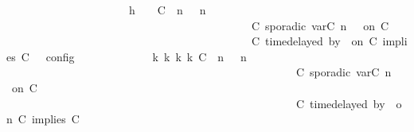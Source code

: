 \begin{isabellebody}
\ \ \ \ \ \ \ \ \isamarkupfalse%
\ {\isacharminus}\isanewline
\ \ \ \ \ \ \ \ \ \ \isamarkupfalse%
\ h{}{\isacharcolon}\ {\isacartoucheopen}{\isasymrho}\ {\isasymin}\ {\isasymlbrakk}\ {\isacharparenleft}{\isacharparenleft}C\ {\isasymUp}\ n{\isacharparenright}\ {\isacharhash}\ {\isasymGamma}{\isacharparenright}{\isacharcomma}\ n\ {\isasymturnstile}\ {\isasymPsi}\isanewline
\ \ \ \ \ \ \ \ \ \ \ \ \ \ \ \ \ \ \ \ \ \ \ \ \ \ \ \ \ \ \ \ \ \ \ \ \ \ \ \ \ \ \ {\isasymtriangleright}\ {\isacharparenleft}{\isacharparenleft}C\ sporadic{\isasymsharp}\ {\isasymlparr}{\isasymtau}\isactrlsub v\isactrlsub a\isactrlsub r{\isacharparenleft}C\ n{\isacharparenright}\ {\isasymoplus}\ {\isasymdelta}{\isasymtau}{\isasymrparr}\ on\ C\isanewline
\ \ \ \ \ \ \ \ \ \ \ \ \ \ \ \ \ \ \ \ \ \ \ \ \ \ \ \ \ \ \ \ \ \ \ \ \ \ \ \ \ \ \ {\isacharhash}\ {\isacharparenleft}C\ time{\isacharminus}delayed{\isasymbowtie}\ by\ {\isasymdelta}{\isasymtau}\ on\ C\ implies\ C\ {\isacharhash}\ {\isasymPhi}{\isacharparenright}\ {\isasymrbrakk}\isactrlsub c\isactrlsub o\isactrlsub n\isactrlsub f\isactrlsub i\isactrlsub g{\isacartoucheclose}\isanewline
\ \ \ \ \ \ \ \ \ \ \isamarkupfalse%
\ \isamarkupfalse%
\ {\isacartoucheopen}{\isasymexists}{\isasymGamma}\isactrlsub k\ {\isasymPsi}\isactrlsub k\ {\isasymPhi}\isactrlsub k\ k{\isachardot}\ {\isacharparenleft}{\isacharparenleft}{\isacharparenleft}{\isacharparenleft}C\ {\isasymUp}\ n{\isacharparenright}\ {\isacharhash}\ {\isasymGamma}{\isacharparenright}{\isacharcomma}\ n\ {\isasymturnstile}\ {\isasymPsi}\isanewline
\ \ \ \ \ \ \ \ \ \ \ \ \ \ \ \ \ \ \ \ \ \ \ \ \ \ \ \ \ \ \ \ \ \ \ \ \ \ \ \ \ \ \ \ \ \ \ \ \ \ \ {\isasymtriangleright}\ {\isacharparenleft}{\isacharparenleft}C\ sporadic{\isasymsharp}\ {\isasymlparr}{\isasymtau}\isactrlsub v\isactrlsub a\isactrlsub r{\isacharparenleft}C\ n{\isacharparenright}\ {\isasymoplus}\ {\isasymdelta}{\isasymtau}{\isasymrparr}\ on\ C\isanewline
\ \ \ \ \ \ \ \ \ \ \ \ \ \ \ \ \ \ \ \ \ \ \ \ \ \ \ \ \ \ \ \ \ \ \ \ \ \ \ \ \ \ \ \ \ \ \ \ \ \ \ {\isacharhash}\ {\isacharparenleft}C\ time{\isacharminus}delayed{\isasymbowtie}\ by\ {\isasymdelta}{\isasymtau}\ on\ C\ implies\ C\ {\isacharhash}\ {\isasymPhi}{\isacharparenright}{\isacharparenright}\isanewline

\end{isabellebody}

